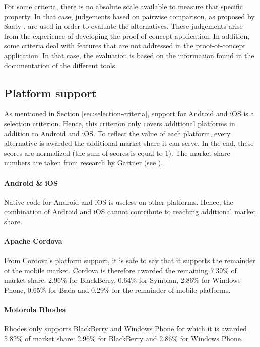 For some criteria, there is no absolute scale available to measure that specific property. In that case, judgements based on pairwise comparison, as proposed by Saaty \cite{Saaty:1980}, are used in order to evaluate the alternatives. These judgements arise from the experience of developing the proof-of-concept application. In addition, some criteria deal with features that are not addressed in the proof-of-concept application. In that case, the evaluation is based on the information found in the documentation of the different tools. 

\subsection{Platform support}

As mentioned in Section \ref{sec:selection-criteria}, support for Android and iOS is a selection criterion. Hence, this criterion only covers additional platforms in addition to Android and iOS. To reflect the value of each platform, every alternative is awarded the additional market share it can serve. In the end, these scores are normalized (the sum of scores is equal to 1). The market share numbers are taken from research by Gartner \citeGartner (see ).

\paragraph{Android \& iOS} Native code for Android and iOS is useless on other platforms. Hence, the combination of Android and iOS cannot contribute to reaching additional market share.

\paragraph{Apache Cordova} From Cordova's platform support, it is safe to say that it supports the remainder of the mobile market. Cordova is therefore awarded the remaining 7.39\% of market share: 2.96\% for BlackBerry, 0.64\% for Symbian, 2.86\% for Windows Phone, 0.65\% for Bada and 0.29\% for the remainder of mobile platforms.

\paragraph{Motorola Rhodes} Rhodes only supports BlackBerry and Windows Phone for which it is awarded 5.82\% of market share: 2.96\% for BlackBerry and 2.86\% for Windows Phone. 

